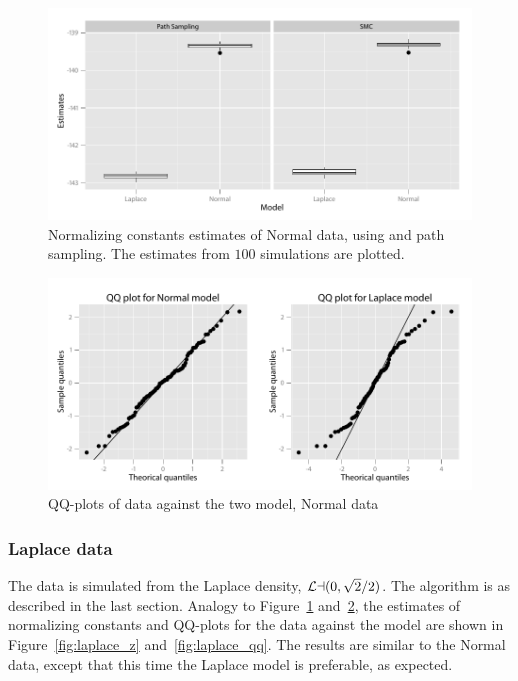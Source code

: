 \begin{figure}[htb]
  \centering
  \includegraphics{fig/5-nz}
  \caption{Normalizing constants estimates of Normal data, using \smc and
    path sampling. The estimates from $100$ simulations are plotted.}
  \label{fig:normal_z}
\end{figure}

\begin{figure}[htb]
  \centering
  \includegraphics{fig/5-nqq}
  \caption{QQ-plots of data against the two model, Normal data}
  \label{fig:normal_qq}
\end{figure}

\subsubsection{Laplace data}

The data is simulated from the Laplace density, $\mathcal{La}(0, \sqrt{2}/2)$. The
algorithm is as described in the last section. Analogy to
Figure~\ref{fig:normal_z} and~\ref{fig:normal_qq}, the estimates of
normalizing constants and QQ-plots for the data against the model are shown in
Figure~\ref{fig:laplace_z} and~\ref{fig:laplace_qq}. The results are similar
to the Normal data, except that this time the Laplace model is preferable, as
expected.

